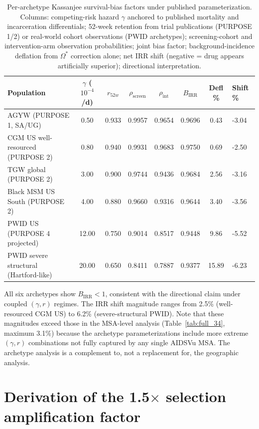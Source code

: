 \documentclass[11pt]{article}
\begin{document}
\begin{table}[H]
\centering
\small
\caption{Per-archetype Kassanjee survival-bias factors under published parameterization. Columns: competing-risk hazard $\gamma$ anchored to published mortality and incarceration differentials; 52-week retention from trial publications (PURPOSE 1/2) or real-world cohort observations (PWID archetypes); screening-cohort and intervention-arm observation probabilities; joint bias factor; background-incidence deflation from $\Omega^*$ correction alone; net IRR shift (negative = drug appears artificially superior); directional interpretation.}
\label{tab:subpop}
\begin{tabular}{lccccccl}
\toprule
Population & $\gamma$ ($10^{-4}$/d) & $r_{52w}$ & $\rho_{\mathrm{screen}}$ & $\rho_{\mathrm{int}}$ & $B_{\mathrm{IRR}}$ & Defl \% & Shift \% \\
\midrule
AGYW (PURPOSE 1, SA/UG) & 0.50 & 0.933 & 0.9957 & 0.9654 & 0.9696 & 0.43 & -3.04 \\
CGM US well-resourced (PURPOSE 2) & 0.80 & 0.940 & 0.9931 & 0.9683 & 0.9750 & 0.69 & -2.50 \\
TGW global (PURPOSE 2) & 3.00 & 0.900 & 0.9744 & 0.9436 & 0.9684 & 2.56 & -3.16 \\
Black MSM US South (PURPOSE 2) & 4.00 & 0.880 & 0.9660 & 0.9316 & 0.9644 & 3.40 & -3.56 \\
PWID US (PURPOSE 4 projected) & 12.00 & 0.750 & 0.9014 & 0.8517 & 0.9448 & 9.86 & -5.52 \\
PWID severe structural (Hartford-like) & 20.00 & 0.650 & 0.8411 & 0.7887 & 0.9377 & 15.89 & -6.23 \\
\bottomrule
\end{tabular}
\vspace{0.3em}
\footnotesize
\begin{flushleft}
All six archetypes show $B_{\mathrm{IRR}} < 1$, consistent with the directional claim under coupled $(\gamma, r)$ regimes. The IRR shift magnitude ranges from 2.5\% (well-resourced CGM US) to 6.2\% (severe-structural PWID). Note that these magnitudes exceed those in the MSA-level analysis (Table~\ref{tab:full_34}, maximum 3.1\%) because the archetype parameterizations include more extreme $(\gamma, r)$ combinations not fully captured by any single AIDSVu MSA. The archetype analysis is a complement to, not a replacement for, the geographic analysis.
\end{flushleft}
\end{table}

\section{Derivation of the 1.5$\times$ selection amplification factor}
\end{document}
